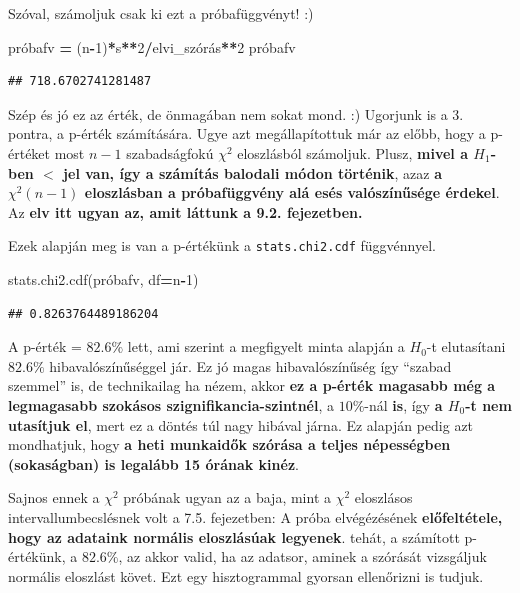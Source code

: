 \documentclass[
]{book}
\newenvironment{Shaded}{\begin{snugshade}}{\end{snugshade}}
\newcommand{\DecValTok}[1]{\textcolor[rgb]{0.00,0.00,0.81}{#1}}
\newcommand{\NormalTok}[1]{#1}
\newcommand{\OperatorTok}[1]{\textcolor[rgb]{0.81,0.36,0.00}{\textbf{#1}}}
\begin{document}
Szóval, számoljuk csak ki ezt a próbafüggvényt! :)

\begin{Shaded}
\begin{Highlighting}[]
\NormalTok{próbafv }\OperatorTok{=}\NormalTok{ (n}\OperatorTok{{-}}\DecValTok{1}\NormalTok{)}\OperatorTok{*}\NormalTok{s}\OperatorTok{**}\DecValTok{2}\OperatorTok{/}\NormalTok{elvi\_szórás}\OperatorTok{**}\DecValTok{2}
\NormalTok{próbafv}
\end{Highlighting}
\end{Shaded}

\begin{verbatim}
## 718.6702741281487
\end{verbatim}

Szép és jó ez az érték, de önmagában nem sokat mond. :) Ugorjunk is a 3. pontra, a p-érték számítására. Ugye azt megállapítottuk már az előbb, hogy a p-értéket most \(n-1\) szabadságfokú \(\chi^2\) eloszlásból számoljuk. Plusz, \textbf{mivel a \(H_1\)-ben \(<\) jel van, így a számítás balodali módon történik}, azaz \textbf{a \(\chi^2(n-1)\) eloszlásban a próbafüggvény alá esés valószínűsége érdekel}. Az \textbf{elv itt ugyan az, amit láttunk a 9.2. fejezetben.}

Ezek alapján meg is van a p-értékünk a \texttt{stats.chi2.cdf} függvénnyel.

\begin{Shaded}
\begin{Highlighting}[]
\NormalTok{stats.chi2.cdf(próbafv, df}\OperatorTok{=}\NormalTok{n}\OperatorTok{{-}}\DecValTok{1}\NormalTok{)}
\end{Highlighting}
\end{Shaded}

\begin{verbatim}
## 0.8263764489186204
\end{verbatim}

A p-érték = \(82.6\%\) lett, ami szerint a megfigyelt minta alapján a \(H_0\)-t elutasítani \(82.6\%\) hibavalószínűséggel jár. Ez jó magas hibavalószínűség így ``szabad szemmel'' is, de technikailag ha nézem, akkor \textbf{ez a p-érték magasabb még a legmagasabb szokásos szignifikancia-szintnél}, a \(10\%\)-nál \textbf{is}, így \textbf{a \(H_0\)-t nem utasítjuk el}, mert ez a döntés túl nagy hibával járna. Ez alapján pedig azt mondhatjuk, hogy \textbf{a heti munkaidők szórása a teljes népességben (sokaságban) is legalább 15 órának kinéz}.

Sajnos ennek a \(\chi^2\) próbának ugyan az a baja, mint a \(\chi^2\) eloszlásos intervallumbecslésnek volt a 7.5. fejezetben: A próba elvégézésének \textbf{előfeltétele, hogy az adataink normális eloszlásúak legyenek}. tehát, a számított p-értékünk, a \(82.6\%\), az akkor valid, ha az adatsor, aminek a szórását vizsgáljuk normális eloszlást követ.
Ezt egy hisztogrammal gyorsan ellenőrizni is tudjuk.
\end{document}
